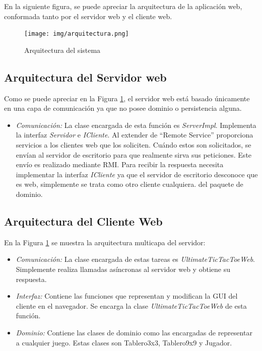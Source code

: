 En la siguiente figura, se puede apreciar la arquitectura de la aplicación web, conformada tanto por el servidor web y el cliente web.

 \begin{figure}[h]
 \centering
 \texttt{[image: img/arquitectura.png]}
 \caption{Arquitectura del sistema}
 \label{arq_sistema}
 \end{figure}

\subsection{Arquitectura del Servidor web}

Como se puede apreciar en la Figura \ref{arq_sistema}, el servidor web está basado únicamente en una capa de comunicación ya que no posee dominio o persistencia alguna.

\begin{itemize}
  \item \emph{Comunicación:} La clase encargada de esta función es \emph{ServerImpl}. Implementa la interfaz \emph{Servidor} e \emph{ICliente}. Al extender de ``Remote Service'' proporciona servicios a los clientes web que los soliciten. Cuándo estos son solicitados, se envían al servidor de escritorio para que realmente sirva sus peticiones. Este envío es realizado mediante RMI. Para recibir la respuesta necesita implementar la interfaz \emph{ICliente} ya que el servidor de escritorio desconoce que es web, simplemente se trata como otro cliente cualquiera.
 del paquete de dominio.
\end{itemize}

\subsection{Arquitectura del Cliente Web}

En la Figura \ref{arq_sistema} se muestra la arquitectura multicapa del servidor:

\begin{itemize}
 \item \emph{Comunicación:} La clase encargada de estas tareas es \emph{UltimateTicTacToeWeb}. Simplemente realiza llamadas asíncronas al servidor web y obtiene su respuesta.
  \item \emph{Interfaz:} Contiene las funciones que representan y modifican la GUI del cliente en el navegador. Se encarga la clase \emph{UltimateTicTacToeWeb} de esta función.
 \item \emph{Dominio:} Contiene las clases de dominio como las encargadas de representar a cualquier juego. Estas clases son Tablero3x3, Tablero9x9 y Jugador.
\end{itemize}
